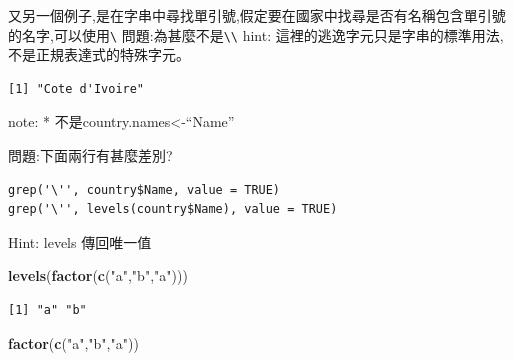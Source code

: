 \documentclass[]{book}
\newenvironment{Shaded}{\begin{snugshade}}{\end{snugshade}}
\newcommand{\CharTok}[1]{\textcolor[rgb]{0.31,0.60,0.02}{#1}}
\newcommand{\DataTypeTok}[1]{\textcolor[rgb]{0.13,0.29,0.53}{#1}}
\newcommand{\KeywordTok}[1]{\textcolor[rgb]{0.13,0.29,0.53}{\textbf{#1}}}
\newcommand{\NormalTok}[1]{#1}
\newcommand{\OperatorTok}[1]{\textcolor[rgb]{0.81,0.36,0.00}{\textbf{#1}}}
\newcommand{\OtherTok}[1]{\textcolor[rgb]{0.56,0.35,0.01}{#1}}
\newcommand{\StringTok}[1]{\textcolor[rgb]{0.31,0.60,0.02}{#1}}
\theoremstyle{definition}
\theoremstyle{definition}
\theoremstyle{definition}
\theoremstyle{remark}
\begin{document}
又另一個例子,是在字串中尋找單引號,假定要在國家中找尋是否有名稱包含單引號的名字,可以使用\texttt{\textquotesingle{}\textbackslash{}\textquotesingle{}\textquotesingle{}}
問題:為甚麼不是\texttt{\textquotesingle{}\textbackslash{}\textbackslash{}\textquotesingle{}\textquotesingle{}}
hint:
這裡的逃逸字元只是字串的標準用法,\texttt{\textquotesingle{}}不是正規表達式的特殊字元。

\begin{Shaded}
\end{Shaded}

\begin{verbatim}
[1] "Cote d'Ivoire"
\end{verbatim}

note: * 不是country.names\textless{}-``Name''

問題:下面兩行有甚麼差別?

\begin{verbatim}
grep('\'', country$Name, value = TRUE)
grep('\'', levels(country$Name), value = TRUE)
\end{verbatim}

Hint: levels 傳回唯一值

\begin{Shaded}
\begin{Highlighting}[]
\KeywordTok{levels}\NormalTok{(}\KeywordTok{factor}\NormalTok{(}\KeywordTok{c}\NormalTok{(}\StringTok{"a"}\NormalTok{,}\StringTok{"b"}\NormalTok{,}\StringTok{"a"}\NormalTok{)))}
\end{Highlighting}
\end{Shaded}

\begin{verbatim}
[1] "a" "b"
\end{verbatim}

\begin{Shaded}
\begin{Highlighting}[]
\KeywordTok{factor}\NormalTok{(}\KeywordTok{c}\NormalTok{(}\StringTok{"a"}\NormalTok{,}\StringTok{"b"}\NormalTok{,}\StringTok{"a"}\NormalTok{))}
\end{Highlighting}
\end{Shaded}
\end{document}
